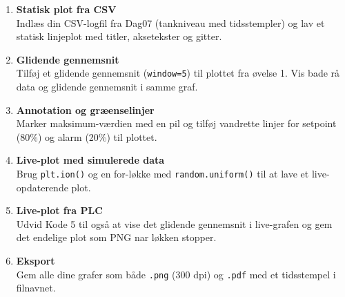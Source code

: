 \documentclass[12pt, a4paper]{article}
\begin{document}
\begin{tcolorbox}[tipbox, title={\faTasks\quad Øvelsesopgaver}]
\begin{enumerate}[leftmargin=1.5em, itemsep=8pt]

  \item \textbf{Statisk plot fra CSV}\\
    Indlæs din CSV-logfil fra Dag07 (tankniveau med tidsstempler) og lav et
    statisk linjeplot med titler, aksetekster og gitter.

  \item \textbf{Glidende gennemsnit}\\
    Tilføj et glidende gennemsnit (\texttt{window=5}) til plottet fra
    øvelse 1. Vis bade rå data og glidende gennemsnit i samme graf.

  \item \textbf{Annotation og græenselinjer}\\
    Marker maksimum-værdien med en pil og tilføj vandrette linjer for
    setpoint (80\%) og alarm (20\%) til plottet.

  \item \textbf{Live-plot med simulerede data}\\
    Brug \texttt{plt.ion()} og en for-løkke med \texttt{random.uniform()}
    til at lave et live-opdaterende plot.

  \item \textbf{Live-plot fra PLC}\\
    Udvid Kode 5 til også at vise det glidende gennemsnit i live-grafen
    og gem det endelige plot som PNG nar løkken stopper.

  \item \textbf{Eksport}\\
    Gem alle dine grafer som både \texttt{.png} (300 dpi) og \texttt{.pdf}
    med et tidsstempel i filnavnet.

\end{enumerate}
\end{tcolorbox}
\end{document}
